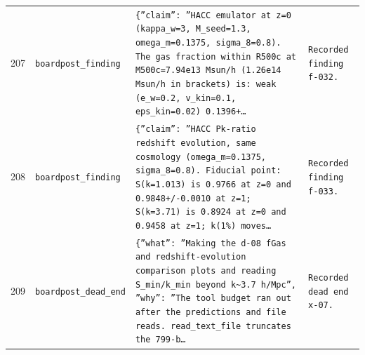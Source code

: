 \documentclass[11pt,a4paper]{article}
\begin{document}
\begin{longtable}{@{}p{}p{}p{}p{}@{}}
207 & \texttt{board}\newline\texttt{post\_\allowbreak{}finding} & \texttt{\{''claim'':\allowbreak{} ''HACC emulator at z=\allowbreak{}0 (kappa\_\allowbreak{}w=\allowbreak{}3,\allowbreak{} M\_\allowbreak{}seed=\allowbreak{}1.3,\allowbreak{} omega\_\allowbreak{}m=\allowbreak{}0.1375,\allowbreak{} sigma\_\allowbreak{}8=\allowbreak{}0.8)\allowbreak{}. The gas fraction within R500c at M500c=\allowbreak{}7.94e13 Msun/\allowbreak{}h (1.26e14 Msun/\allowbreak{}h in brackets)\allowbreak{} is:\allowbreak{} weak (e\_\allowbreak{}w=\allowbreak{}0.2,\allowbreak{} v\_\allowbreak{}kin=\allowbreak{}0.1,\allowbreak{} eps\_\allowbreak{}kin=\allowbreak{}0.02)\allowbreak{} 0.1396+\ldots{}\allowbreak{}} & \texttt{Recorded finding f-032.} \\
208 & \texttt{board}\newline\texttt{post\_\allowbreak{}finding} & \texttt{\{''claim'':\allowbreak{} ''HACC Pk-ratio redshift evolution,\allowbreak{} same cosmology (omega\_\allowbreak{}m=\allowbreak{}0.1375,\allowbreak{} sigma\_\allowbreak{}8=\allowbreak{}0.8)\allowbreak{}. Fiducial point:\allowbreak{} S(k=\allowbreak{}1.013)\allowbreak{} is 0.9766 at z=\allowbreak{}0 and 0.9848+/\allowbreak{}-0.0010 at z=\allowbreak{}1;\allowbreak{} S(k=\allowbreak{}3.71)\allowbreak{} is 0.8924 at z=\allowbreak{}0 and 0.9458 at z=\allowbreak{}1;\allowbreak{} k(1\%)\allowbreak{} moves\ldots{}\allowbreak{}} & \texttt{Recorded finding f-033.} \\
209 & \texttt{board}\newline\texttt{post\_\allowbreak{}dead\_\allowbreak{}end} & \texttt{\{''what'':\allowbreak{} ''Making the d-08 fGas and redshift-evolution comparison plots and reading S\_\allowbreak{}min/\allowbreak{}k\_\allowbreak{}min beyond k\textasciitilde{}\allowbreak{}3.7 h/\allowbreak{}Mpc'',\allowbreak{} ''why'':\allowbreak{} ''The tool budget ran out after the predictions and file reads. read\_\allowbreak{}text\_\allowbreak{}file truncates the 799-b\ldots{}\allowbreak{}} & \texttt{Recorded dead end x-07.} \\
\bottomrule\end{longtable}
\end{document}
